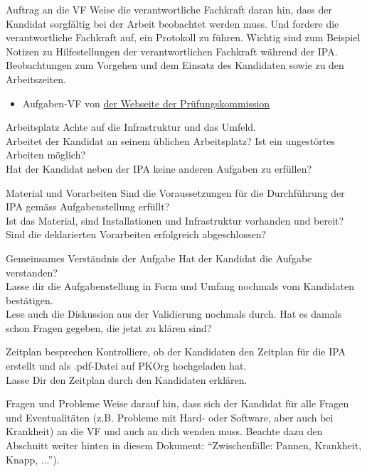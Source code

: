 \begin{taskitemwithoutcomment}{Auftrag an die VF}
  Weise die verantwortliche Fachkraft daran hin, dass der Kandidat sorgfältig bei der Arbeit beobachtet werden muss. Und fordere die verantwortliche Fachkraft auf, ein Protokoll zu führen. Wichtig sind zum Beispiel Notizen zu Hilfestellungen der verantwortlichen Fachkraft während der IPA. Beobachtungen zum Vorgehen und dem Einsatz des Kandidaten sowie zu den Arbeitszeiten.
  \begin{itemize}
    \item Aufgaben-VF von \href{https://pk19.ch}{der Webseite der Prüfungskommission}
  \end{itemize}
\end{taskitemwithoutcomment}
\begin{taskitem}{Arbeitsplatz}
  Achte auf die Infrastruktur und das Umfeld.\\Arbeitet der Kandidat an seinem üblichen Arbeitsplatz? Ist ein ungestörtes Arbeiten möglich?\\Hat der Kandidat neben der IPA keine anderen Aufgaben zu erfüllen?
\end{taskitem}
\newpage
\begin{taskitem}{Material und Vorarbeiten}
  Sind die Voraussetzungen für die Durchführung der IPA gemäss Aufgabenstellung erfüllt?\\Ist das Material, sind Installationen und Infrastruktur vorhanden und bereit?\\Sind die deklarierten Vorarbeiten erfolgreich abgeschlossen?
\end{taskitem}
\begin{taskitem}{Gemeinsames Verständnis der Aufgabe}
  Hat der Kandidat die Aufgabe verstanden?\\Lasse dir die Aufgabenstellung in Form und Umfang nochmals vom Kandidaten bestätigen.\\Lese auch die Diskussion aus der Validierung nochmals durch. Hat es damals schon Fragen gegeben, die jetzt zu klären sind?
\end{taskitem}
\begin{taskitem}{Zeitplan besprechen}
  Kontrolliere, ob der Kandidaten den Zeitplan für die IPA erstellt und als .pdf-Datei auf PKOrg hochgeladen hat.\\Lasse Dir den Zeitplan durch den Kandidaten erklären.
\end{taskitem}
\newpage
\begin{taskitem}{Fragen und Probleme}
  Weise darauf hin, dass sich der Kandidat für alle Fragen und Eventualitäten (z.B. Probleme mit Hard- oder Software, aber auch bei Krankheit) an die VF und auch an dich wenden muss. Beachte dazu den Abschnitt weiter hinten in diesem Dokument: \enquote{Zwischenfälle: Pannen, Krankheit, Knapp, ...}).
\end{taskitem}
